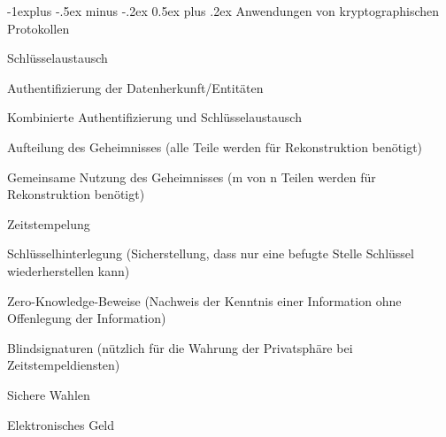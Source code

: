\documentclass[a4paper]{article}
\makeatletter
\renewcommand{\subsection}{\@startsection{subsection}{2}{0mm}%
 {-1explus -.5ex minus -.2ex}%
 {0.5ex plus .2ex}%
 {\normalfont\normalsize\bfseries}}
\makeatother
\begin{document}
\begin{multicols}{3}
      \subsection{Anwendungen von kryptographischen Protokollen}
      \begin{itemize*}
            \item Schlüsselaustausch
            \item Authentifizierung der Datenherkunft/Entitäten
            \item Kombinierte Authentifizierung und Schlüsselaustausch
            \item Aufteilung des Geheimnisses (alle Teile werden für Rekonstruktion benötigt)
            \item Gemeinsame Nutzung des Geheimnisses (m von n Teilen werden für Rekonstruktion benötigt)
            \item Zeitstempelung
            \item Schlüsselhinterlegung (Sicherstellung, dass nur eine befugte Stelle Schlüssel wiederherstellen kann)
            \item Zero-Knowledge-Beweise (Nachweis der Kenntnis einer Information ohne Offenlegung der Information)
            \item Blindsignaturen (nützlich für die Wahrung der Privatsphäre bei Zeitstempeldiensten)
            \item Sichere Wahlen
            \item Elektronisches Geld
      \end{itemize*}


\end{multicols}
\end{document}
